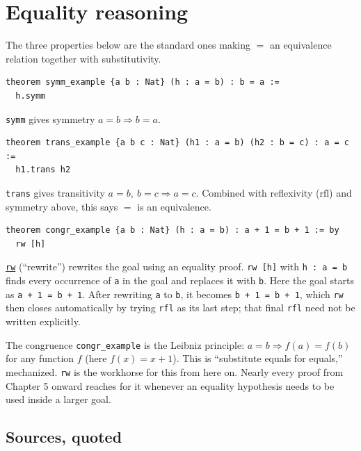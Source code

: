 \section{Equality reasoning}\label{sec:04-propositions-and-proofs:07-equality:1}

The three properties below are the standard ones making \(=\) an equivalence relation together with substitutivity.

\begin{lstlisting}
theorem symm_example {a b : Nat} (h : a = b) : b = a :=
  h.symm
\end{lstlisting}

\texttt{symm} gives symmetry \(a = b \Rightarrow b = a\).

\begin{lstlisting}
theorem trans_example {a b c : Nat} (h1 : a = b) (h2 : b = c) : a = c :=
  h1.trans h2
\end{lstlisting}

\texttt{trans} gives transitivity \(a = b,\ b = c \Rightarrow a = c\). Combined with reflexivity (\(\mathrm{rfl}\)) and symmetry above, this says \(=\) is an equivalence.

\begin{lstlisting}
theorem congr_example {a b : Nat} (h : a = b) : a + 1 = b + 1 := by
  rw [h]
\end{lstlisting}

\href{https://lean-lang.org/doc/reference/latest/Tactic-Proofs/Tactic-Reference/}{\texttt{rw}} (``rewrite'') rewrites the goal using an equality proof. \texttt{rw [h]} with \texttt{h : a = b} finds every occurrence of \texttt{a} in the goal and replaces it with \texttt{b}. Here the goal starts as \texttt{a + 1 = b + 1}. After rewriting \texttt{a} to \texttt{b}, it becomes \texttt{b + 1 = b + 1}, which \texttt{rw} then closes automatically by trying \texttt{rfl} as its last step; that final \texttt{rfl} need not be written explicitly.

The congruence \texttt{congr\_\allowbreak{}example} is the Leibniz principle: \(a = b \Rightarrow
f(a) = f(b)\) for any function \(f\) (here \(f(x) = x + 1\)). This is ``substitute equals for equals,'' mechanized. \texttt{rw} is the workhorse for this from here on. Nearly every proof from Chapter 5 onward reaches for it whenever an equality hypothesis needs to be used inside a larger goal.

\subsection{Sources, quoted}\label{sec:04-propositions-and-proofs:07-equality:2}

